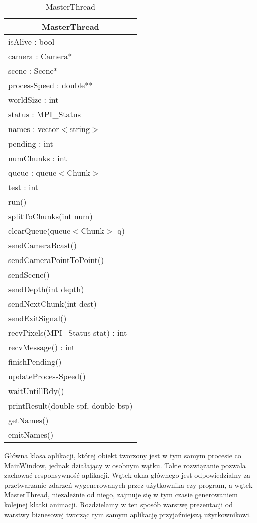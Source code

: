 \begin{longtable}{|p{16cm}|}
    \caption{MasterThread} \label{tab:MasterThread} \\ \hline
    \multicolumn{1}{|c|}{MasterThread} \\ \hline
    isAlive : bool \\
    camera : Camera* \\
    scene : Scene* \\
    processSpeed : double** \\
    worldSize : int \\
    status : MPI\_Status \\
    names : vector$<$string$>$ \\
    pending : int \\
    numChunks : int \\
    queue : queue$<$Chunk$>$ \\
    test : int \\
    \hline
	run() \\
	splitToChunks(int num) \\
	clearQueue(queue$<$Chunk$>$ q) \\
    sendCameraBcast() \\
    sendCameraPointToPoint() \\
    sendScene() \\
    sendDepth(int depth) \\
    sendNextChunk(int dest) \\
    sendExitSignal() \\
    recvPixels(MPI\_Status stat) : int \\
    recvMessage() : int \\
    finishPending() \\
    updateProcessSpeed() \\
    waitUntillRdy() \\
    printResult(double spf, double bsp) \\
    getNames() \\
    emitNames() \\
	\hline
\end{longtable}

Główna klasa aplikacji, której obiekt tworzony jest w tym samym procesie co MainWindow, jednak działający w osobnym wątku. Takie rozwiązanie pozwala zachować responsywność aplikacji. Wątek okna głównego jest odpowiedzialny za przetwarzanie zdarzeń wygenerowanych przez użytkownika czy program, a wątek MasterThread, niezależnie od niego, zajmuje się w tym czasie generowaniem kolejnej klatki animacji. Rozdzielamy w ten sposób warstwę prezentacji od warstwy biznesowej tworząc tym samym aplikację przyjaźniejszą użytkownikowi.

